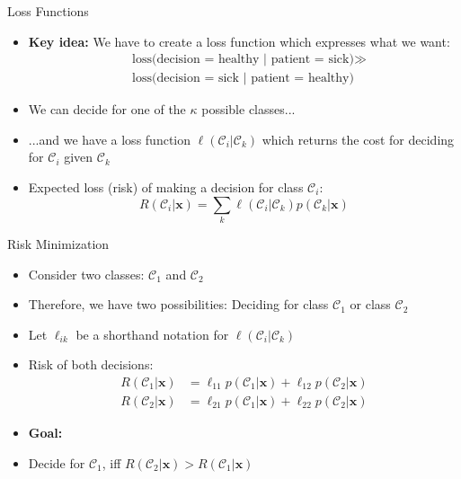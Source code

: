 \begin{frame}{Loss Functions}{}
	\begin{itemize}
		\item \textbf{Key idea:} We have to create a loss function which expresses what we want:
		\begin{align*}
			&\text{loss(decision = healthy | patient = sick)} \gg \\
			&\text{loss(decision = sick | patient = healthy)}
		\end{align*}
		\item We can decide for one of the $\kappa$ possible classes...
		\item ...and we have a loss function $\ell(\mathcal{C}_i \vert \mathcal{C}_k)$ which returns the cost for deciding for $\mathcal{C}_i$ given $\mathcal{C}_k$ {\footnotesize {}}
		\item Expected loss (risk) of making a decision for class $\mathcal{C}_i$:
		\begin{equation}
			R(\mathcal{C}_i \vert \bm{x}) = \sum_k \ell(\mathcal{C}_i \vert \mathcal{C}_k) p(\mathcal{C}_k \vert \bm{x})
		\end{equation}
	\end{itemize}
\end{frame}


\begin{frame}{Risk Minimization}{}
	\begin{itemize}
		\item Consider two classes: $\mathcal{C}_1$ and $\mathcal{C}_2$
		\item Therefore, we have two possibilities: Deciding for class $\mathcal{C}_1$ or class $\mathcal{C}_2$
		\item Let $\ell_{ik}$ be a shorthand notation for $\ell(\mathcal{C}_i \vert \mathcal{C}_k)$
		\item Risk of both decisions:
		\begin{align*}
			R(\mathcal{C}_1 \vert \bm{x}) &= \ell_{11} p(\mathcal{C}_1 \vert \bm{x}) + \ell_{12} p(\mathcal{C}_2 \vert \bm{x}) \\
			R(\mathcal{C}_2 \vert \bm{x}) &= \ell_{21} p(\mathcal{C}_1 \vert \bm{x}) + \ell_{22} p(\mathcal{C}_2 \vert \bm{x})
		\end{align*}
		\item \textbf{Goal:} 
		\item Decide for $\mathcal{C}_1$, iff $R(\mathcal{C}_2 \vert \bm{x}) > R(\mathcal{C}_1 \vert \bm{x})$
	\end{itemize}
\end{frame}


